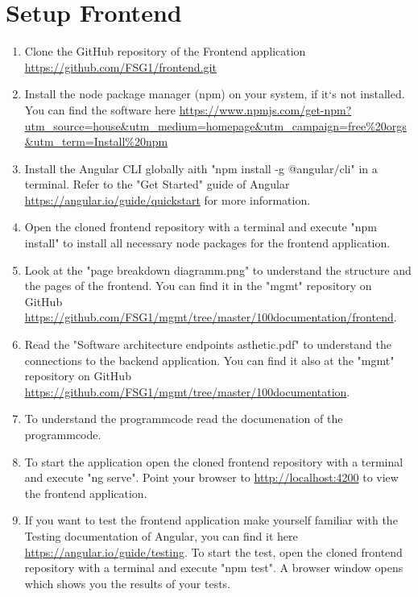 \chapter{Setup Frontend}


\begin{enumerate}
	\item Clone the GitHub repository of the Frontend application \url{https://github.com/FSG1/frontend.git}
	
	\item Install the node package manager (npm) on your system, if it‘s not installed. You can find the software here \url{https://www.npmjs.com/get-npm?utm\_source=house\&utm\_medium=homepage\&utm\_campaign=free\%20orgs\&utm\_term=Install\%20npm}
	
	\item Install the Angular CLI globally aith "npm install -g @angular/cli" in a terminal. Refer to the "Get Started" guide of Angular \url{https://angular.io/guide/quickstart} for more information.
	
	\item Open the cloned frontend repository with a terminal and execute "npm install" to install all necessary node packages for the frontend application.
	
	\item Look at the "page breakdown diagramm.png" to understand the structure and the pages of the frontend. You can find it in the "mgmt" repository on GitHub \url{https://github.com/FSG1/mgmt/tree/master/100documentation/frontend}.
	
	\item Read the "Software architecture endpoints asthetic.pdf" to understand the connections to the backend application. You can find it also at the "mgmt" repository on GitHub \url{https://github.com/FSG1/mgmt/tree/master/100documentation}.
	
	\item To understand the programmcode read the documenation of the programmcode.
	
	\item To start the application open the cloned frontend repository with a terminal and execute "ng serve". Point your browser to \url{http://localhost:4200} to view the frontend application.
	
	\item If you want to test the frontend application make yourself familiar with the Testing documentation of Angular, you can find it here \url{https://angular.io/guide/testing}. To start the test, open the cloned frontend repository with a terminal and execute "npm test". A browser window opens which shows you the results of your tests.
\end{enumerate}

